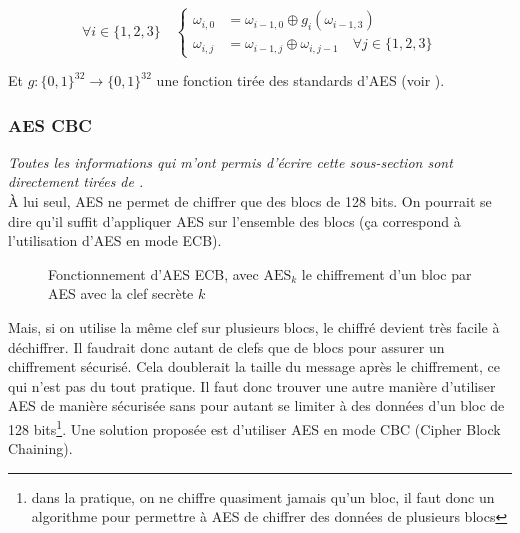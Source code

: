 \documentclass[a4paper, 12pt]{article}
\begin{document}
$$
\forall i \in \{1,2,3\} \quad 
\begin{cases}
	\omega_{i,0} &= \omega_{i-1,0} \oplus g_i(\omega_{i-1,3}) \\
	\omega_{i,j} &= \omega_{i-1,j} \oplus \omega_{i,j-1} \quad \forall j \in \{1,2,3\} 
\end{cases}
$$

\noindent Et $g: \{0,1\}^{32} \rightarrow \{0,1\}^{32}$ une fonction tirée des standards d'AES (voir \cite{aesnist}).


\subsubsection{AES CBC}\label{sectioncbc}
\noindent\emph{Toutes les informations qui m'ont permis d'écrire cette sous-section sont directement tirées de \cite{courscourt}.}\\

À lui seul, AES ne permet de chiffrer que des blocs de 128 bits. On pourrait se dire qu'il suffit d'appliquer AES sur l'ensemble des blocs (ça correspond à l'utilisation d'AES en mode ECB). 

\begin{figure}[h]
\centering
{}
\caption{Fonctionnement d'AES ECB, avec $\text{AES}_k$ le chiffrement d'un bloc par AES avec la clef secrète $k$}
\label{ilu_ECB}
\end{figure}

Mais, si on utilise la même clef sur plusieurs blocs, le chiffré devient très facile à déchiffrer. Il faudrait donc autant de clefs que de blocs pour assurer un chiffrement sécurisé. Cela doublerait la taille du message après le chiffrement, ce qui n'est pas du tout pratique.  Il faut donc trouver une autre manière d'utiliser AES de manière sécurisée sans pour autant se limiter à des données d'un bloc de 128 bits\footnote{dans la pratique, on ne chiffre quasiment jamais qu'un bloc, il faut donc un algorithme pour permettre à AES de chiffrer des données de plusieurs blocs}. Une solution proposée est d'utiliser AES en mode CBC (Cipher Block Chaining). \\
\end{document}
